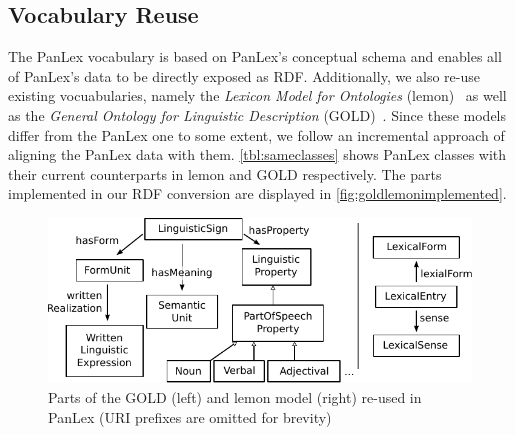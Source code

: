 \documentclass[sw]{iosart2c}
\begin{document}
\subsection{Vocabulary Reuse}
\label{sec:vocabulary-reuse}
The PanLex vocabulary is based on PanLex's conceptual schema and
enables all of PanLex's data to be directly exposed as RDF.
Additionally, we also re-use existing vocuabularies, namely
the \emph{Lexicon Model for Ontologies} (lemon)~\cite{lemon2011} as well as the \emph{General Ontology for Linguistic Description} (GOLD)~\cite{farr2003}.
Since these models differ from the PanLex one to some extent, we follow an
incremental approach of aligning the PanLex data with them.
\autoref{tbl:sameclasses} shows PanLex classes with their current counterparts
in lemon and GOLD respectively.
The parts implemented in our RDF conversion are displayed in \autoref{fig:goldlemonimplemented}.
\begin{figure}
  \centering
  \includegraphics[width=\linewidth]{images/pdf/gold_lemon_implemented.pdf}
  \caption{Parts of the GOLD (left) and lemon model (right) re-used in PanLex (URI prefixes are omitted for brevity)}
  \label{fig:goldlemonimplemented}
\end{figure}
\end{document}
